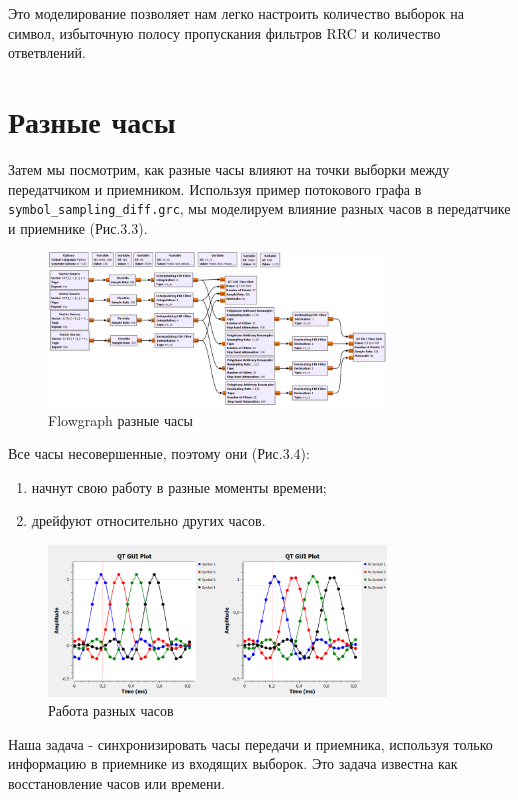 \documentclass[a4paper,12pt]{report}
\begin{document}
    Это моделирование позволяет нам легко настроить количество выборок на символ, избыточную полосу пропускания фильтров RRC и количество ответвлений.
    
\section{Разные часы}
    Затем мы посмотрим, как разные часы влияют на точки выборки между передатчиком и приемником. Используя пример потокового графа в \texttt{symbol\_sampling\_diff.grc}, мы моделируем влияние разных часов в передатчике и приемнике (Рис.3.3).
\begin{figure}[H]
        \centering
        \includegraphics[width=0.8\textwidth]{fig3-3.PNG}
        \caption{Flowgraph разные часы}
        \label{fig:fig3-3}
\end{figure}
    
    Все часы несовершенные, поэтому они (Рис.3.4):
\begin{enumerate} 
  \item начнут свою работу в разные моменты времени; 
  \item дрейфуют относительно других часов.
\end{enumerate}
\begin{figure}[H]
        \centering
        \includegraphics[width=0.8\textwidth]{fig3-4.PNG}
        \caption{Работа разных часов}
        \label{fig:fig3-4}
\end{figure}

    Наша задача - синхронизировать часы передачи и приемника, используя только информацию в приемнике из входящих выборок. Это задача известна как восстановление часов или времени.
    
\end{document}
